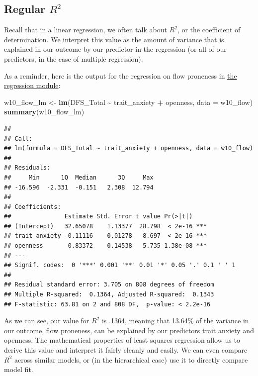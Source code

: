 \documentclass[
]{book}
\newenvironment{Shaded}{\begin{snugshade}}{\end{snugshade}}
\newcommand{\AttributeTok}[1]{\textcolor[rgb]{0.13,0.29,0.53}{#1}}
\newcommand{\FunctionTok}[1]{\textcolor[rgb]{0.13,0.29,0.53}{\textbf{#1}}}
\newcommand{\NormalTok}[1]{#1}
\newcommand{\OtherTok}[1]{\textcolor[rgb]{0.56,0.35,0.01}{#1}}
\newcommand{\SpecialCharTok}[1]{\textcolor[rgb]{0.81,0.36,0.00}{\textbf{#1}}}
\begin{document}
\subsection{\texorpdfstring{Regular \(R^2\)}{Regular R\^{}2}}\label{regular-r2}

Recall that in a linear regression, we often talk about \(R^2\), or the coefficient of determination. We interpret this value as the amount of variance that is explained in our outcome by our predictor in the regression (or all of our predictors, in the case of multiple regression).

As a reminder, here is the output for the regression on flow proneness in \hyperref[multreg-intro]{the regression module}:

\begin{Shaded}
\begin{Highlighting}[]
\NormalTok{w10\_flow\_lm }\OtherTok{\textless{}{-}} \FunctionTok{lm}\NormalTok{(DFS\_Total }\SpecialCharTok{\textasciitilde{}}\NormalTok{ trait\_anxiety }\SpecialCharTok{+}\NormalTok{ openness, }\AttributeTok{data =}\NormalTok{ w10\_flow)}
\FunctionTok{summary}\NormalTok{(w10\_flow\_lm)}
\end{Highlighting}
\end{Shaded}

\begin{verbatim}
## 
## Call:
## lm(formula = DFS_Total ~ trait_anxiety + openness, data = w10_flow)
## 
## Residuals:
##     Min      1Q  Median      3Q     Max 
## -16.596  -2.331  -0.151   2.308  12.794 
## 
## Coefficients:
##               Estimate Std. Error t value Pr(>|t|)    
## (Intercept)   32.65078    1.13377  28.798  < 2e-16 ***
## trait_anxiety -0.11116    0.01278  -8.697  < 2e-16 ***
## openness       0.83372    0.14538   5.735 1.38e-08 ***
## ---
## Signif. codes:  0 '***' 0.001 '**' 0.01 '*' 0.05 '.' 0.1 ' ' 1
## 
## Residual standard error: 3.705 on 808 degrees of freedom
## Multiple R-squared:  0.1364, Adjusted R-squared:  0.1343 
## F-statistic: 63.81 on 2 and 808 DF,  p-value: < 2.2e-16
\end{verbatim}

As we can see, our value for \(R^2\) is .1364, meaning that 13.64\% of the variance in our outcome, flow proneness, can be explained by our predictors trait anxiety and openness. The mathematical properties of least squares regression allow us to derive this value and interpret it fairly cleanly and easily. We can even compare \(R^2\) across similar models, or (in the hierarchical case) use it to directly compare model fit.
\end{document}
